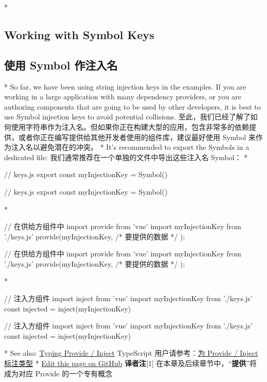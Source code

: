 \begin{paracol}{2}
 
\switchcolumn[0]*%
\subsection{Working with Symbol Keys}
\switchcolumn
\subsection{使用 Symbol 作注入名}
\switchcolumn[0]*%
So far, we have been using string injection keys in the examples. If you
are working in a large application with many dependency providers, or
you are authoring components that are going to be used by other
developers, it is best to use Symbol injection keys to avoid potential
collisions.
\switchcolumn
至此，我们已经了解了如何使用字符串作为注入名。但如果你正在构建大型的应用，包含非常多的依赖提供，或者你正在编写提供给其他开发者使用的组件库，建议最好使用
Symbol 来作为注入名以避免潜在的冲突。
\switchcolumn[0]*%
It's recommended to export the Symbols in a dedicated file:
\switchcolumn
我们通常推荐在一个单独的文件中导出这些注入名 Symbol：
\switchcolumn[0]*%
\begin{codeJs}
// keys.js
export const myInjectionKey = Symbol()
\end{codeJs}
\switchcolumn
\begin{codeJs}
// keys.js
export const myInjectionKey = Symbol()
\end{codeJs}
\switchcolumn[0]*%
\begin{codeHtml}
// 在供给方组件中
import { provide } from 'vue'
import { myInjectionKey } from './keys.js'
provide(myInjectionKey, { /*
  要提供的数据
*/ });
\end{codeHtml}
\switchcolumn
\begin{codeHtml}
// 在供给方组件中
import { provide } from 'vue'
import { myInjectionKey } from './keys.js'
provide(myInjectionKey, { /*
  要提供的数据
*/ });
\end{codeHtml}
\switchcolumn[0]*%
\begin{codeJs}
// 注入方组件
import { inject } from 'vue'
import { myInjectionKey } from './keys.js'
const injected = inject(myInjectionKey)
\end{codeJs}
\switchcolumn
\begin{codeJs}
// 注入方组件
import { inject } from 'vue'
import { myInjectionKey } from './keys.js'
const injected = inject(myInjectionKey)
\end{codeJs}
\switchcolumn[0]*%
See also:
\href{https://vuejs.org/guide/typescript/composition-api.html\#typing-provide-inject}{Typing
Provide / Inject}
\switchcolumn
TypeScript
用户请参考：\href{https://cn.vuejs.org/guide/typescript/composition-api.html\#typing-provide-inject}{为
Provide / Inject 标注类型}
\switchcolumn[0]*%
\href{https://github.com/vuejs/docs/edit/main/src/guide/components/provide-inject.md}{Edit
this page on GitHub}
\switchcolumn
\textbf{译者注}{[}1{]} 在本章及后续章节中，``\textbf{提供}''将成为对应
Provide 的一个专有概念
\end{paracol}